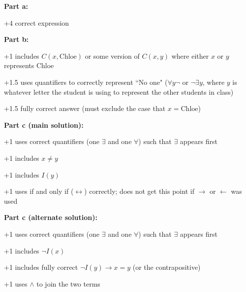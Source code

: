 \documentclass[12pt]{exam}
\begin{document}
\begin{solution}
\textbf{Part a:}
\begin{guidelines}
    \item +4 correct expression
\end{guidelines}
\textbf{Part b:}
\begin{guidelines}
    \item +1 includes $C(x,\text{Chloe})$ or some version of $C(x, y)$ where either $x$ or $y$ represents Chloe
    \item +1.5 uses quantifiers to correctly represent ``No one" ($\forall y \neg$ or $\neg\exists y$, where $y$ is whatever letter the student is using to represent the other students in class)
    \item +1.5 fully correct answer (must exclude the case that $x=\text{Chloe}$)
\end{guidelines}
\textbf{Part c (main solution):}
\begin{guidelines}
    \item +1 uses correct quantifiers (one $\exists$ and one $\forall$) such that $\exists$ appears first
    \item +1 includes $x \neq y$
    \item +1 includes $I(y)$
    \item +1 uses if and only if ($\leftrightarrow$) correctly; does not get this point if $\rightarrow$ or $\leftarrow$ was used
\end{guidelines}
\textbf{Part c (alternate solution):}
\begin{guidelines}
    \item +1 uses correct quantifiers (one $\exists$ and one $\forall$) such that $\exists$ appears first
    \item +1 includes $\neg I(x)$
    \item +1 includes fully correct $\neg I(y) \to x=y$ (or the contrapositive)
    \item +1 uses $\wedge$ to join the two terms
\end{guidelines}
\end{solution}
\end{document}
